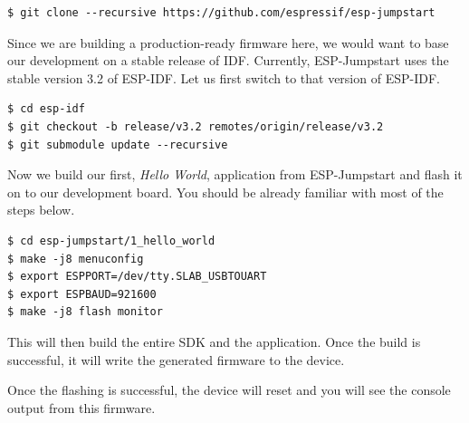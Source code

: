 \documentclass[main.tex]{subfiles}
\begin{document}
\begin{verbatim}
$ git clone --recursive https://github.com/espressif/esp-jumpstart
\end{verbatim}

Since we are building a production-ready firmware here, we would want to base our development on a stable release of IDF. Currently, ESP-Jumpstart uses the stable version 3.2 of ESP-IDF. Let us first switch to that version of ESP-IDF.
\begin{verbatim}
$ cd esp-idf
$ git checkout -b release/v3.2 remotes/origin/release/v3.2
$ git submodule update --recursive
\end{verbatim}

Now we build our first, \textit{Hello World}, application from ESP-Jumpstart and flash it on to our development board. You should be already familiar with most of the steps below.

\begin{verbatim}
$ cd esp-jumpstart/1_hello_world
$ make -j8 menuconfig
$ export ESPPORT=/dev/tty.SLAB_USBTOUART
$ export ESPBAUD=921600
$ make -j8 flash monitor
\end{verbatim}

This will then build the entire SDK and the application. Once the build is successful, it will write the generated firmware to the device.


Once the flashing is successful, the device will reset and you will see the console output from this firmware.
\end{document}
